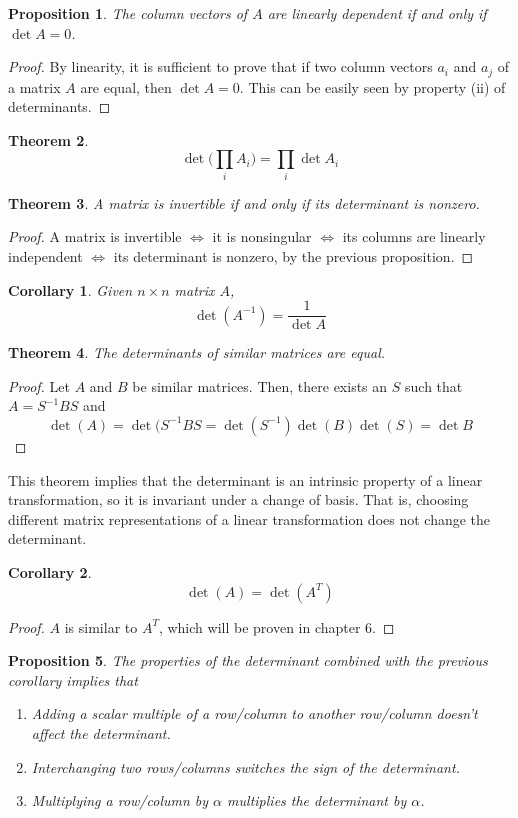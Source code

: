 \documentclass{article}
\newtheorem{theorem}{Theorem}[section]
\newtheorem{proposition}[theorem]{Proposition}
\newtheorem{corollary}{Corollary}[theorem]
\theoremstyle{remark}
\theoremstyle{definition}
\begin{document}
\begin{proposition}
The column vectors of $A$ are linearly dependent if and only if $\det{A} = 0$. 
\end{proposition}
\begin{proof}
By linearity, it is sufficient to prove that if two column vectors $a_i$ and $a_j$ of a matrix $A$ are equal, then $\det{A} = 0$. This can be easily seen by property (ii) of determinants. 
\end{proof}

\begin{theorem}
\[ \det{\bigg(\prod_i A_i \bigg)} = \prod_i \det{A_i}\]
\end{theorem}

\begin{theorem}
A matrix is invertible if and only if its determinant is nonzero. 
\end{theorem}
\begin{proof}
A matrix is invertible $\iff$ it is nonsingular $\iff$ its columns are linearly independent $\iff$ its determinant is nonzero, by the previous proposition. 
\end{proof}

\begin{corollary}
Given $n \times n$ matrix $A$,
\[\det{(A^{-1})} = \frac{1}{\det{A}}\]
\end{corollary}

\begin{theorem}
The determinants of similar matrices are equal. 
\end{theorem}
\begin{proof}
Let $A$ and $B$ be similar matrices. Then, there exists an $S$ such that $A = S^{-1} B S$ and 
\[ \det{(A)} = \det{(S^{-1} B S} = \det{(S^{-1})} \det{(B)} \det{(S)} = \det{B}\]
\end{proof}

This theorem implies that the determinant is an intrinsic property of a linear transformation, so it is invariant under a change of basis. That is, choosing different matrix representations of a linear transformation does not change the determinant.  

\begin{corollary}
\[\det{(A)} = \det{(A^T)}\]
\end{corollary}
\begin{proof}
$A$ is similar to $A^T$, which will be proven in chapter 6. 
\end{proof}

\begin{proposition}
The properties of the determinant combined with the previous corollary implies that 
\begin{enumerate}
    \item Adding a scalar multiple of a row/column to another row/column doesn't affect the determinant. 
    \item Interchanging two rows/columns switches the sign of the determinant. 
    \item Multiplying a row/column by $\alpha$ multiplies the determinant by $\alpha$. 
\end{enumerate}
\end{proposition}
\end{document}
